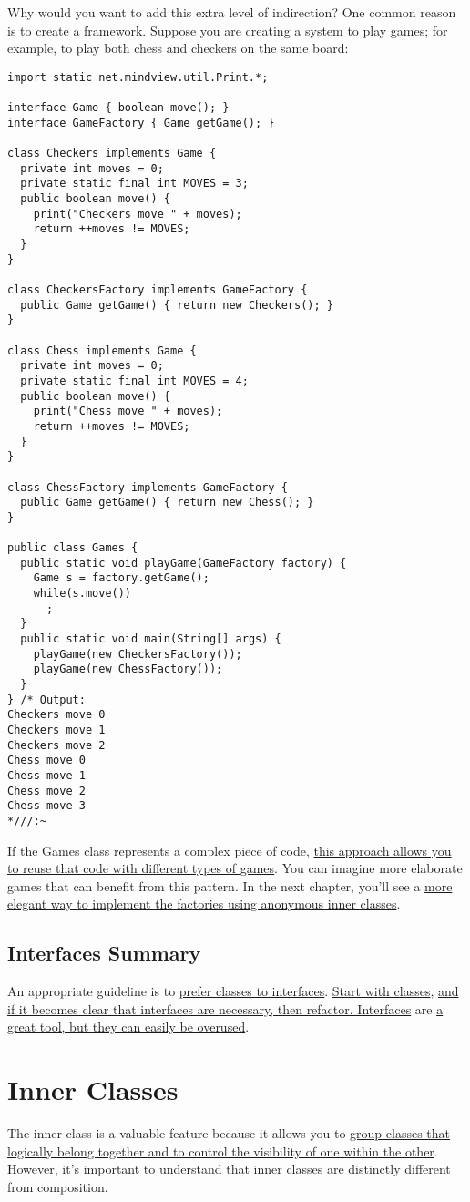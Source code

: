 \documentclass[10pt,letterpaper]{report}
\begin{document}
Why would you want to add this extra level of indirection? One common reason is to create a framework. Suppose you are creating a system to play games; for example, to play both chess and checkers on the same board:
\begin{lstlisting}
import static net.mindview.util.Print.*;

interface Game { boolean move(); }
interface GameFactory { Game getGame(); }

class Checkers implements Game {
  private int moves = 0;
  private static final int MOVES = 3;
  public boolean move() {
    print("Checkers move " + moves);
    return ++moves != MOVES;
  }
}

class CheckersFactory implements GameFactory {
  public Game getGame() { return new Checkers(); }
}	

class Chess implements Game {
  private int moves = 0;
  private static final int MOVES = 4;
  public boolean move() {
    print("Chess move " + moves);
    return ++moves != MOVES;
  }
}

class ChessFactory implements GameFactory {
  public Game getGame() { return new Chess(); }
}	

public class Games {
  public static void playGame(GameFactory factory) {
    Game s = factory.getGame();
    while(s.move())
      ;
  }
  public static void main(String[] args) {
    playGame(new CheckersFactory());
    playGame(new ChessFactory());
  }
} /* Output:
Checkers move 0
Checkers move 1
Checkers move 2
Chess move 0
Chess move 1
Chess move 2
Chess move 3
*///:~
\end{lstlisting}
If the Games class represents a complex piece of code, \underline{this approach allows you} \underline{to reuse that code with different types of games}. You can imagine more elaborate games that can benefit from this pattern. In the next chapter, you'll see a \underline{more elegant way to implement the factories using anonymous inner classes}.
\section{Interfaces Summary}
An appropriate guideline is to \underline{prefer classes to interfaces}. \underline{Start with classes}, \underline{and if it becomes clear that interfaces are necessary, then refactor. Interfaces} are \underline{a great tool, but they can easily be overused}.
\chapter{Inner Classes}
The inner class is a valuable feature because it allows you to \underline{group classes that} \underline{logically belong together and to control the visibility of one within the other}. However, it's important to understand that inner classes are distinctly different from composition.
\end{document}
